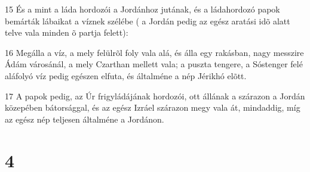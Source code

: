 \par 15 És a mint a láda hordozói a Jordánhoz jutának, és a ládahordozó papok bemárták lábaikat a víznek szélébe ( a Jordán pedig az egész aratási idõ alatt telve vala minden õ partja felett):
\par 16 Megálla a víz, a mely felülrõl foly vala alá, és álla egy rakásban, nagy messzire Ádám városánál, a mely Czarthan mellett vala; a puszta tengere, a Sóstenger felé aláfolyó víz pedig egészen elfuta, és általméne a nép Jérikhó elõtt.
\par 17 A papok pedig, az Úr frigyládájának hordozói, ott állának a szárazon a Jordán közepében bátorsággal, és az egész Izráel szárazon megy vala át, mindaddig, míg az egész nép teljesen általméne a Jordánon.

\chapter{4}

